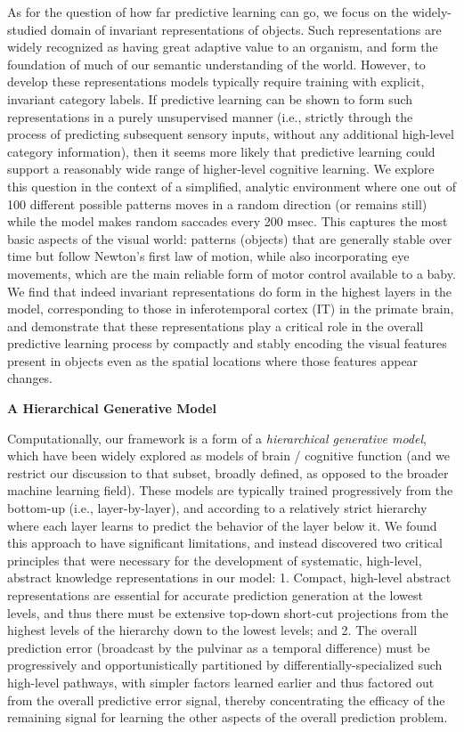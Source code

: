 \documentclass[10pt,twocolumn]{article}
\newif\myifpdf
\begin{document}
As for the question of how far predictive learning can go, we focus on the widely-studied domain of invariant representations of objects.  Such representations are widely recognized as having great adaptive value to an organism, and form the foundation of much of our semantic understanding of the world.  However, to develop these representations models typically require training with explicit, invariant category labels. If predictive learning can be shown to form such representations in a purely unsupervised manner (i.e., strictly through the process of predicting subsequent sensory inputs, without any additional high-level category information), then it seems more likely that predictive learning could support a reasonably wide range of higher-level cognitive learning.  We explore this question in the context of a simplified, analytic environment where one out of 100 different possible patterns  moves in a random direction (or remains still) while the model makes random saccades every 200 msec. This captures the most basic aspects of the visual world: patterns (objects) that are generally stable over time but follow Newton's first law of motion, while also incorporating eye movements, which are the main reliable form of motor control available to a baby.   We find that indeed invariant representations do form in the highest layers in the model, corresponding to those in inferotemporal cortex (IT) in the primate brain, and demonstrate that these representations play a critical role in the overall predictive learning process by compactly and stably encoding the visual features present in objects even as the spatial locations where those features appear changes.

\begin{center}
\textbf{A Hierarchical Generative Model}
\end{center}

Computationally, our framework is a form of a {\em hierarchical generative model}, which have been widely explored as models of brain / cognitive function (and we restrict our discussion to that subset, broadly defined, as opposed to the broader machine learning field).  These models are typically trained progressively from the bottom-up (i.e., layer-by-layer), and according to a relatively strict hierarchy where each layer learns to predict the behavior of the layer below it.  We found this approach to have significant limitations, and instead discovered two critical principles that were necessary for the development of systematic, high-level, abstract knowledge representations in our model: 1. Compact, high-level abstract representations are essential for accurate prediction generation at the lowest levels, and thus there must be extensive top-down short-cut projections from the highest levels of the hierarchy down to the lowest levels; and 2. The overall prediction error (broadcast by the pulvinar as a temporal difference) must be progressively and opportunistically partitioned by differentially-specialized such high-level pathways, with simpler factors learned earlier and thus factored out from the overall predictive error signal, thereby concentrating the efficacy of the remaining signal for learning the other aspects of the overall prediction problem.
\end{document}
